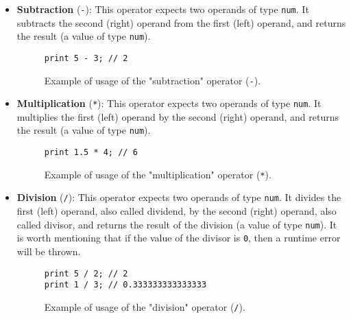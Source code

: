 \begin{itemize}
\begin{itemize}
\begin{itemize}
                    
                    \item \textbf{Subtraction} (\texttt{-}): This operator expects two operands of type \texttt{num}. It subtracts the second (right) operand from the first (left) operand, and returns the result (a value of type \texttt{num}).
                    \begin{figure}[H]
                        \centering
                        \begin{lstlisting}
print 5 - 3; // 2
                        \end{lstlisting}
                        \caption{Example of usage of the "subtraction" operator (\texttt{-}).}
                    \end{figure}
                    
                    \item \textbf{Multiplication} (\texttt{*}): This operator expects two operands of type \texttt{num}. It multiplies the first (left) operand by the second (right) operand, and returns the result (a value of type \texttt{num}).
                    \begin{figure}[H]
                        \centering
                        \begin{lstlisting}
print 1.5 * 4; // 6
                        \end{lstlisting}
                        \caption{Example of usage of the "multiplication" operator (\texttt{*}).}
                    \end{figure}
                    
                    \item \textbf{Division} (\texttt{/}): This operator expects two operands of type \texttt{num}. It divides the first (left) operand, also called dividend, by the second (right) operand, also called divisor, and returns the result of the division (a value of type \texttt{num}). It is worth mentioning that if the value of the divisor is \texttt{0}, then a runtime error will be thrown.
                    \begin{figure}[H]
                        \centering
                        \begin{lstlisting}
print 5 / 2; // 2
print 1 / 3; // 0.333333333333333
                        \end{lstlisting}
                        \caption{Example of usage of the "division" operator (\texttt{/}).}
                    \end{figure}


\end{itemize}
\end{itemize}
\end{itemize}
